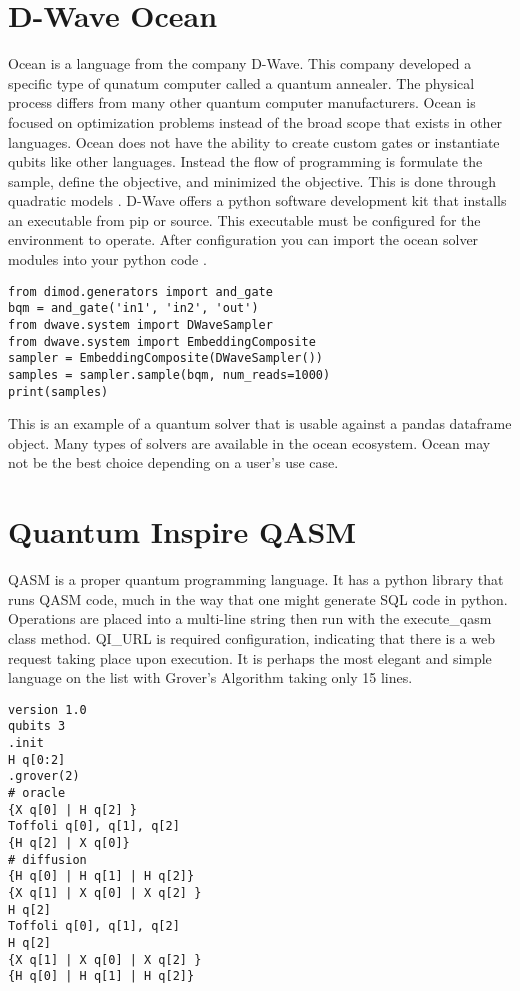 \documentclass[conference]{IEEEtran}
\begin{document}
\section{D-Wave Ocean}
Ocean is a language from the company D-Wave. 
This company developed a specific type of qunatum computer called a quantum annealer. 
The physical process differs from many other quantum computer manufacturers. 
Ocean is focused on optimization problems instead of the broad scope that exists in other languages. 
Ocean does not have the ability to create custom gates or instantiate qubits like other languages. 
Instead the flow of programming is formulate the sample, define the objective, and minimized the objective. 
This is done through quadratic models \cite{b11}.
D-Wave offers a python software development kit that installs an executable from pip or source. 
This executable must be configured for the environment to operate. After configuration you can import the ocean solver modules into your python code \cite{b11}.


\begin{verbatim}
from dimod.generators import and_gate
bqm = and_gate('in1', 'in2', 'out')
from dwave.system import DWaveSampler
from dwave.system import EmbeddingComposite
sampler = EmbeddingComposite(DWaveSampler())
samples = sampler.sample(bqm, num_reads=1000)
print(samples)
\end{verbatim}

This is an example of a quantum solver that is usable against a pandas dataframe object. 
Many types of solvers are available in the ocean ecosystem.
Ocean may not be the best choice depending on a user's use case.

\section{Quantum Inspire QASM}
QASM is a proper quantum programming language. 
It has a python library that runs QASM code, much in the way that one might generate SQL code in python. 
Operations are placed into a multi-line string then run with the execute\_qasm class method. 
QI\_URL is required configuration, indicating that there is a web request taking place upon execution. 
It is perhaps the most elegant and simple language on the list with Grover's Algorithm taking only 15 lines.
\begin{verbatim}
version 1.0
qubits 3
.init
H q[0:2]
.grover(2)
# oracle
{X q[0] | H q[2] }
Toffoli q[0], q[1], q[2]
{H q[2] | X q[0]}
# diffusion
{H q[0] | H q[1] | H q[2]}
{X q[1] | X q[0] | X q[2] }
H q[2]
Toffoli q[0], q[1], q[2]
H q[2]
{X q[1] | X q[0] | X q[2] }
{H q[0] | H q[1] | H q[2]}
\end{verbatim}
\end{document}
